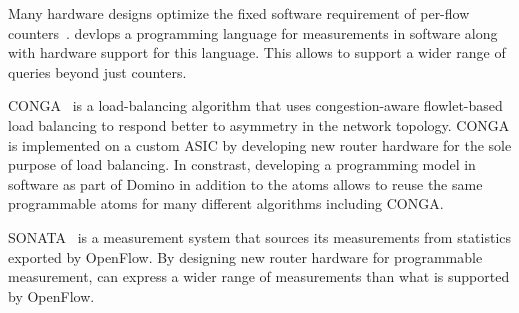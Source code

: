  Many hardware designs optimize the fixed
software requirement of per-flow counters~\cite{counter_shah}.
\TheSystem devlops a programming language for measurements in software along
with hardware support for this language. This allows \TheSystem to support a
wider range of queries beyond just counters.

 CONGA~\cite{conga} is a load-balancing algorithm that uses
congestion-aware flowlet-based load balancing to respond better to asymmetry in
the network topology. CONGA is implemented on a custom ASIC by developing new
router hardware for the sole purpose of load balancing. In constrast,
developing a programming model in software as part of Domino in addition to the
atoms allows to reuse the same programmable atoms for many different algorithms
including CONGA.

 SONATA~\cite{streaming-monitoring} is a measurement system that sources its
measurements from statistics exported by OpenFlow. By designing new router
hardware for programmable measurement, \TheSystem can express a wider range of
measurements than what is supported by OpenFlow.
